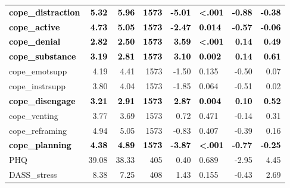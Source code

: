 \documentclass[]{article}
\begin{document}
\begin{table}[H]
\begin{tabular}[t]{lrrrrlrr}
\textcolor{black}{\textbf{cope\_distraction}} & \textcolor{black}{\textbf{5.32}} & \textcolor{black}{\textbf{5.96}} & \textcolor{black}{\textbf{1573}} & \textcolor{black}{\textbf{-5.01}} & \textcolor{black}{\textbf{<.001}} & \textcolor{black}{\textbf{-0.88}} & \textcolor{black}{\textbf{-0.38}}\\
\textcolor{black}{\textbf{cope\_active}} & \textcolor{black}{\textbf{4.73}} & \textcolor{black}{\textbf{5.05}} & \textcolor{black}{\textbf{1573}} & \textcolor{black}{\textbf{-2.47}} & \textcolor{black}{\textbf{0.014}} & \textcolor{black}{\textbf{-0.57}} & \textcolor{black}{\textbf{-0.06}}\\
\addlinespace
\textcolor{black}{\textbf{cope\_denial}} & \textcolor{black}{\textbf{2.82}} & \textcolor{black}{\textbf{2.50}} & \textcolor{black}{\textbf{1573}} & \textcolor{black}{\textbf{3.59}} & \textcolor{black}{\textbf{<.001}} & \textcolor{black}{\textbf{0.14}} & \textcolor{black}{\textbf{0.49}}\\
\textcolor{black}{\textbf{cope\_substance}} & \textcolor{black}{\textbf{3.19}} & \textcolor{black}{\textbf{2.81}} & \textcolor{black}{\textbf{1573}} & \textcolor{black}{\textbf{3.10}} & \textcolor{black}{\textbf{0.002}} & \textcolor{black}{\textbf{0.14}} & \textcolor{black}{\textbf{0.61}}\\
cope\_emotsupp & 4.19 & 4.41 & 1573 & -1.50 & 0.135 & -0.50 & 0.07\\
cope\_instrsupp & 3.80 & 4.04 & 1573 & -1.85 & 0.064 & -0.51 & 0.02\\
\textcolor{black}{\textbf{cope\_disengage}} & \textcolor{black}{\textbf{3.21}} & \textcolor{black}{\textbf{2.91}} & \textcolor{black}{\textbf{1573}} & \textcolor{black}{\textbf{2.87}} & \textcolor{black}{\textbf{0.004}} & \textcolor{black}{\textbf{0.10}} & \textcolor{black}{\textbf{0.52}}\\
\addlinespace
cope\_venting & 3.77 & 3.69 & 1573 & 0.72 & 0.471 & -0.14 & 0.31\\
cope\_reframing & 4.94 & 5.05 & 1573 & -0.83 & 0.407 & -0.39 & 0.16\\
\textcolor{black}{\textbf{cope\_planning}} & \textcolor{black}{\textbf{4.38}} & \textcolor{black}{\textbf{4.89}} & \textcolor{black}{\textbf{1573}} & \textcolor{black}{\textbf{-3.87}} & \textcolor{black}{\textbf{<.001}} & \textcolor{black}{\textbf{-0.77}} & \textcolor{black}{\textbf{-0.25}}\\
PHQ & 39.08 & 38.33 & 405 & 0.40 & 0.689 & -2.95 & 4.45\\
DASS\_stress & 8.38 & 7.25 & 408 & 1.43 & 0.155 & -0.43 & 2.69\\

\end{tabular}
\end{table}
\end{document}
